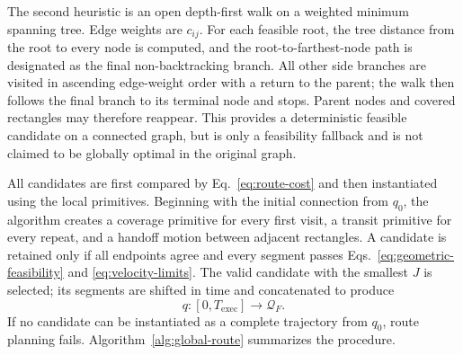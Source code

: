 The second heuristic is an open depth-first walk on a weighted minimum spanning tree. Edge weights are $c_{ij}$. For each feasible root, the tree distance from the root to every node is computed, and the root-to-farthest-node path is designated as the final non-backtracking branch. All other side branches are visited in ascending edge-weight order with a return to the parent; the walk then follows the final branch to its terminal node and stops. Parent nodes and covered rectangles may therefore reappear. This provides a deterministic feasible candidate on a connected graph, but is only a feasibility fallback and is not claimed to be globally optimal in the original graph.

All candidates are first compared by Eq.~\eqref{eq:route-cost} and then instantiated using the local primitives. Beginning with the initial connection from $q_0$, the algorithm creates a coverage primitive for every first visit, a transit primitive for every repeat, and a handoff motion between adjacent rectangles. A candidate is retained only if all endpoints agree and every segment passes Eqs.~\eqref{eq:geometric-feasibility} and \eqref{eq:velocity-limits}. The valid candidate with the smallest $J$ is selected; its segments are shifted in time and concatenated to produce
\begin{equation}
q:[0,T_{\mathrm{exec}}]\rightarrow\mathcal Q_F.
\tag{22}
\label{eq:complete-trajectory}
\end{equation}
If no candidate can be instantiated as a complete trajectory from $q_0$, route planning fails. Algorithm~\ref{alg:global-route} summarizes the procedure.

